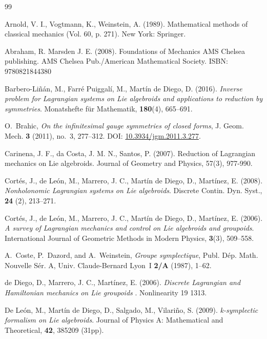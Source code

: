\documentclass[12pt,letterpaper]{article}
\numberwithin{equation}{section}
\begin{document}
\begin{thebibliography}{99}           

 Arnold, V. I., Vogtmann, K.,  Weinstein, A. (1989). Mathematical methods of classical mechanics (Vol. 60, p. 271). New York: Springer.

 Abraham, R. Marsden J. E. (2008). Foundations of Mechanics AMS Chelsea publishing. AMS Chelsea Pub./American Mathematical Society.
ISBN: 9780821844380                                                                             

 Barbero-Li\~n\'an, M., Farr\'e Puiggal\'i, M., Mart\'in de Diego, D. (2016). \emph{Inverse problem for Lagrangian systems on Lie algebroids and applications to reduction by symmetries}. Monatshefte f\"ur Mathematik, \textbf{180}(4), 665--691.

 O.~Brahic, \emph{On the infinitesimal gauge symmetries of closed forms}, J. Geom. Mech. \textbf{3} (2011), no.~3, 277--312.
\newblock DOI: \href{https://doi.org/10.3934/jgm.2011.3.277}{10.3934/jgm.2011.3.277}.

 Carinena, J. F., da Costa, J. M. N., Santos, P. (2007). Reduction of Lagrangian mechanics on Lie algebroids. Journal of Geometry and Physics, 57(3), 977-990.

 Cort\'es, J., de Le\'on, M., Marrero, J. C., Mart\'in de Diego, D., Mart\'inez, E. (2008). \emph{Nonholonomic Lagrangian systems on Lie algebroids}. Discrete Contin. Dyn. Syst., \textbf{24} (2), 213--271.

 Cort\'es, J., de Le\'on, M., Marrero, J. C., Mart\'in de Diego, D., Mart\'inez, E. (2006). \emph{A survey of Lagrangian mechanics and control on Lie algebroids and groupoids}. International Journal of Geometric Methods in Modern Physics, \textbf{3}(3), 509--558.

 A.~Coste, P.~Dazord, and A.~Weinstein, \emph{Groupe symplectique}, Publ. D\'{e}p. Math. Nouvelle S\'{e}r. A, Univ. Claude-Bernard Lyon~I \textbf{2/A} (1987), 1--62.

 de Diego, D., Marrero, J. C., Mart\'inez, E. (2006). \emph{Discrete Lagrangian and Hamiltonian mechanics on Lie groupoids }.  Nonlinearity 19 1313.

 De Le\'on, M., Mart\'in de Diego, D., Salgado, M., Vilari\~no, S. (2009). \emph{k-symplectic formalism on Lie algebroids}. Journal of Physics A: Mathematical and Theoretical, \textbf{42}, 385209 (31pp).


\end{thebibliography}
\end{document}
